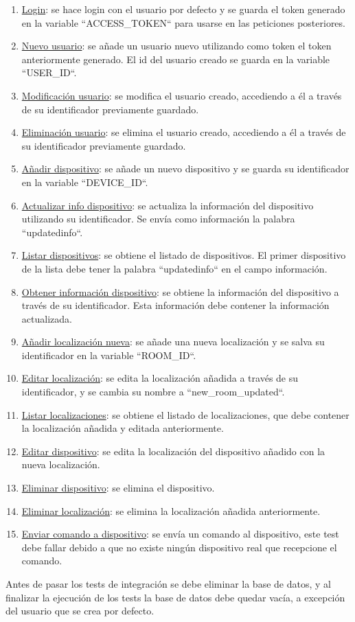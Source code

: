 \begin{enumerate}
\item\underline{Login}: se hace login con el usuario por defecto y se guarda el token generado en la variable ``ACCESS\_TOKEN``
 para usarse en las peticiones posteriores.
\item\underline{Nuevo usuario}: se añade un usuario nuevo utilizando como token el token anteriormente generado. El id del usuario creado se
guarda en la variable ``USER\_ID``.
\item\underline{Modificación usuario}: se modifica el usuario creado, accediendo a él a través de su identificador previamente guardado.
\item\underline{Eliminación usuario}: se elimina el usuario creado, accediendo a él a través de su identificador previamente guardado.
\item\underline{Añadir dispositivo}: se añade un nuevo dispositivo y se guarda su identificador en la variable ``DEVICE\_ID``.
\item\underline{Actualizar info dispositivo}: se actualiza la información del dispositivo utilizando su identificador. Se envía como información
la palabra ``updatedinfo``.
\item\underline{Listar dispositivos}: se obtiene el listado de dispositivos. El primer dispositivo de la lista debe tener la palabra ``updatedinfo``
en el campo información.
\item\underline{Obtener información dispositivo}: se obtiene la información del dispositivo a través de su identificador. Esta información debe contener la información actualizada.
\item\underline{Añadir localización nueva}: se añade una nueva localización y se salva su identificador en la variable ``ROOM\_ID``.
\item\underline{Editar localización}: se edita la localización añadida a través de su identificador, y se cambia su nombre a ``new\_room\_updated``.
\item\underline{Listar localizaciones}: se obtiene el listado de localizaciones, que debe contener la localización añadida y editada anteriormente.
\item\underline{Editar dispositivo}: se edita la localización del dispositivo añadido con la nueva localización.
\item\underline{Eliminar dispositivo}: se elimina el dispositivo.
\item\underline{Eliminar localización}: se elimina la localización añadida anteriormente.
\item\underline{Enviar comando a dispositivo}: se envía un comando al dispositivo, este test debe fallar debido a que no existe ningún dispositivo real que 
recepcione el comando.
\end{enumerate}

Antes de pasar los tests de integración se debe eliminar la base de datos, y al finalizar la ejecución de los tests la base de datos debe quedar vacía, a
excepción del usuario que se crea por defecto.

\label{sect:intecompletos}
 
